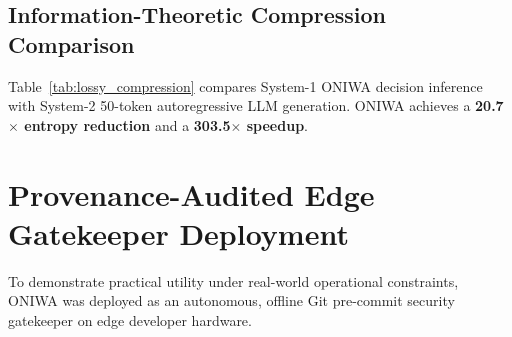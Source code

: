 \documentclass[10pt,twocolumn,letterpaper]{article}
\begin{document}
\subsection{Information-Theoretic Compression Comparison}
Table~\ref{tab:lossy_compression} compares System-1 ONIWA decision inference with System-2 50-token autoregressive LLM generation. ONIWA achieves a \textbf{20.7$\times$ entropy reduction} and a \textbf{303.5$\times$ speedup}.

\begin{table}[htbp]
\centering
\caption{Lossy compression benchmark across 4 domain samples.}
\label{tab:lossy_compression}
\end{table}

\section{Provenance-Audited Edge Gatekeeper Deployment}

To demonstrate practical utility under real-world operational constraints, ONIWA was deployed as an autonomous, offline Git pre-commit security gatekeeper on edge developer hardware.
\end{document}
